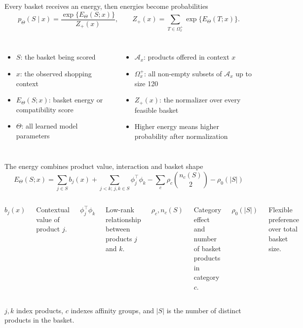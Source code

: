 \documentclass[aspectratio=169,11pt,t]{beamer}
\begin{document}
\begin{frame}{Every basket receives an energy, then energies become probabilities}
\[
p_{\Theta}(S\mid x)
=\frac{\exp\{E_{\Theta}(S;x)\}}{Z_{+}(x)},
\qquad
Z_{+}(x)=\sum_{T\in\Omega_x^{+}}\exp\{E_{\Theta}(T;x)\}.
\]

\begin{columns}[T,onlytextwidth]
  \begin{itemize}
    \item $S$: the basket being scored
    \item $x$: the observed shopping context
    \item $E_{\Theta}(S;x)$: basket energy or compatibility score
    \item $\Theta$: all learned model parameters
  \end{itemize}

  \begin{itemize}
    \item $\mathcal A_x$: products offered in context $x$
    \item $\Omega_x^{+}$: all non-empty subsets of $\mathcal A_x$ up to size 120
    \item $Z_{+}(x)$: the normalizer over every feasible basket
    \item Higher energy means higher probability after normalization
  \end{itemize}
\end{columns}
\end{frame}

\begin{frame}{The energy combines product value, interaction and basket shape}
\[
\boxed{
E_{\Theta}(S;x)=
\sum_{j\in S}b_j(x)
+\sum_{j<k;\,j,k\in S}\phi_j^{\top}\phi_k
-\sum_c\rho_c\binom{n_c(S)}{2}
-\rho_0(|S|)
}
\]

\begin{columns}[T,onlytextwidth]
  \textbf{$b_j(x)$}\par
  Contextual value of product $j$.

  \textbf{$\phi_j^{\top}\phi_k$}\par
  Low-rank relationship between products $j$ and $k$.

  \textbf{$\rho_c,n_c(S)$}\par
  Category effect and number of basket products in category $c$.

  \textbf{$\rho_0(|S|)$}\par
  Flexible preference over total basket size.
\end{columns}

\vspace{0.35cm}
$j,k$ index products, $c$ indexes affinity groups, and $|S|$ is the number of distinct
products in the basket.
\end{frame}
\end{document}

